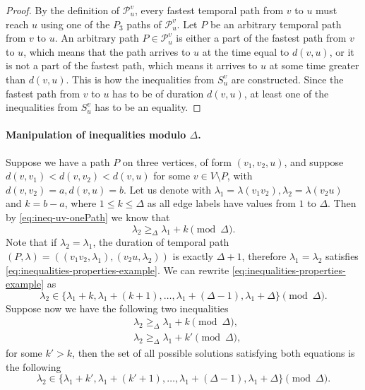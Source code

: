 \documentclass[11pt,a4paper]{article}
\theoremstyle{remark}
\theoremstyle{definition}
\begin{document}
    \begin{proof}
    By the definition of $\mathcal{P}_u^v$, every fastest temporal path from $v$ to $u$ must reach $u$ using one of the $P_3$ paths of $\mathcal{P}_u^v$.
    Let $P$ be an arbitrary temporal path from $v$ to $u$. 
    An arbitrary path $P \in \mathcal{P}_u^v$ is either a part of the fastest path from $v$ to $u$, which means that the path arrives to $u$ at the time equal to $d(v,u)$,
    or it is not a part of the fastest path, which means it arrives to $u$ at some time greater than $d(v,u)$.
    This is how the inequalities from $S_u^v$ are constructed. 
    Since the fastest path from $v$ to $u$ has to be of duration $d(v,u)$, at least one of the inequalities from $S_u^v$ has to be an equality.    
    \end{proof}
    
    
    \paragraph{Manipulation of inequalities modulo $\Delta$.}
    Suppose we have a path $P$ on three vertices, of form $(v_1, v_2, u)$,
    and suppose $d(v,v_1) < d(v,v_2) < d(v,u)$ for some $v \in V \setminus P$, with $d(v,v_2) = a, d(v,u)=b$. 
    Let us denote with $\lambda_1 = \lambda(v_1 v_2), \lambda_2 = \lambda(v_2 u)$ and $k = b-a$, where $1 \leq k \leq \Delta$ as all edge labels have values from $1$ to $\Delta$.
    Then by \cref{eq:ineq-uv-onePath} we know that 
    \begin{equation}\label{eq:inequalities-properties-example}
        \lambda_2 \geq_\Delta \lambda_1 + k \pmod \Delta.
    \end{equation}
    Note that if $\lambda_2 = \lambda_1$, the duration of temporal path $(P, \lambda) = ((v_1v_2, \lambda_1), (v_2u, \lambda_2))$ is exactly $\Delta+1$,
    therefore $\lambda_1 = \lambda_2$ satisfies \cref{eq:inequalities-properties-example}.
    We can rewrite \cref{eq:inequalities-properties-example} as
    \begin{equation*}
        \lambda_2 \in 
        \{
        \lambda_1 + k, \lambda_1 + (k + 1), \dots , \lambda_1 + (\Delta - 1), \lambda_1 + \Delta 
        \} \pmod \Delta.
    \end{equation*}
    Suppose now we have the following two inequalities
    \begin{align*}
        & \lambda_2 \geq_\Delta \lambda_1 + k \pmod \Delta, \\
        & \lambda_2 \geq_\Delta \lambda_1 + k' \pmod \Delta,
    \end{align*}
    for some $k' > k$, then the set of all possible solutions satisfying both equations is the following
        \begin{equation*}
        \lambda_2 \in 
        \{
        \lambda_1 + k', \lambda_1 + (k' + 1), \dots , \lambda_1 + (\Delta - 1), \lambda_1 + \Delta 
        \} \pmod \Delta.
    \end{equation*}
    
\end{document}
